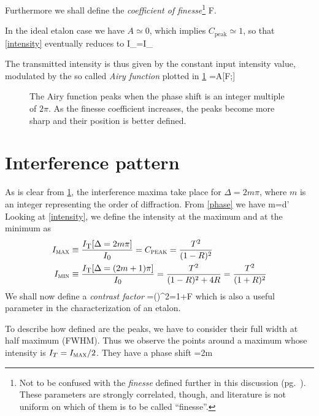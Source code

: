 Furthermore we shall define the \textit{coefficient of finesse}\footnote{Not to be confused with the \textit{finesse} defined further in this discussion (pg.~\pageref{finesse}). These parameters are strongly correlated, though, and literature is not uniform on which of them is to be called \textquotedblleft finesse\textquotedblright.}
\mate
F\equiv{}.
\atem

In the ideal etalon case we have $A\simeq0$, which implies $C_{\mbox{peak}}\simeq1$,  so that \cref{intensity} eventually reduces to
\mate
I_{}=I_{}\ 
\atem

The transmitted intensity is thus given by the constant input intensity value, modulated by the so called \textit{Airy function} plotted in \cref{Airyplot}
\mate
{}=\equiv A[F;\Delta]
\atem

\begin{figure}[!htb]\centering

\caption{The Airy function peaks when the phase shift is an integer multiple of $2\pi$. As the finesse coefficient increases, the peaks become more sharp and their position is better defined.}
\label{Airyplot}
\end{figure}
	\section{Interference pattern}
As is clear from \cref{Airyplot}, the interference maxima take place for $\Delta=2m\pi$, where $m$ is an integer representing the order of diffraction.
From \cref{phase} we have
\mate
m=d\cos\theta'
\label{ordine}
\atem
Looking at \cref{intensity}, we define the intensity at the maximum and at the minimum as
\begin{align}
I_{\mbox{\footnotesize{\scshape{max}}}}&\equiv\frac{I_{\mbox{\footnotesize{\scshape{T}}}}[\Delta=2m\pi]}{I_{\mbox{\footnotesize{\scshape{0}}}}}=C_{\mbox{\footnotesize{\scshape{peak}}}}=\frac{T^2}{(1-R)^2}\\
I_{\mbox{\footnotesize{\scshape{min}}}}&\equiv\frac{I_{\mbox{\footnotesize{\scshape{T}}}}[\Delta=(2m+1)\pi]}{I_{\mbox{\footnotesize{\scshape{0}}}}}=\frac{T^2}{(1-R)^2+4R}=\frac{T^2}{(1+R)^2}
\end{align}
We shall now define a \textit{contrast factor}
\mate
{}\equiv{}=\left(\right)^2=1+F
\atem
which is also a useful parameter in the characterization of an etalon.

To describe how defined are the peaks, we have to consider their full width at half maximum (FWHM). Thus we observe the points around a maximum whose intensity is $I_{T}=I_{\mbox{\footnotesize{\scshape{max}}}}/2$. They have a phase shift 
\mate
\Delta=2m\pi\pm{}
\atem

